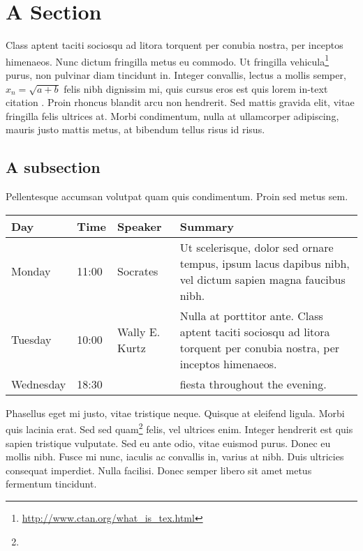 \documentclass[12pt,a4paper]{article}
\begin{document}
\newpage
\section{A Section}
\label{sec:1}

Class aptent taciti sociosqu ad litora torquent per conubia nostra,
per inceptos himenaeos. Nunc dictum fringilla metus eu commodo.  Ut
fringilla
vehicula\footnote{\url{http://www.ctan.org/what_is_tex.html}} purus,
non pulvinar diam tincidunt in. Integer convallis, lectus a mollis
semper, $x_n = \sqrt{a + b}$ felis nibh dignissim mi, quis cursus eros
est quis lorem in-text citation \cite[p.\ 19]{Abook2011}.  Proin
rhoncus blandit arcu non hendrerit. Sed mattis gravida elit, vitae
fringilla felis ultrices at. Morbi condimentum, nulla at ullamcorper
adipiscing, mauris justo mattis metus, at bibendum tellus risus id
risus.

\subsection{A subsection}
\label{sec:1-1}

Pellentesque accumsan volutpat quam quis condimentum. Proin sed metus
sem.

\begin{center}
  \begin{tabular}{ | l | l | l | p{5cm} |}
    \hline
    Day & Time & Speaker & Summary \\ \hline
    Monday & 11:00 & Socrates &  Ut scelerisque, dolor sed
    ornare tempus, ipsum lacus dapibus nibh, vel dictum sapien magna
    faucibus nibh. \\ \hline
    Tuesday & 10:00 & Wally E. Kurtz & Nulla at porttitor ante. Class aptent taciti sociosqu ad litora torquent per conubia nostra, per inceptos himenaeos. \\ \hline
    Wednesday & 18:30 & &  fiesta throughout the evening. \\
    \hline
    \end{tabular}
\end{center}

Phasellus eget mi justo, vitae tristique neque. Quisque at eleifend
ligula. Morbi quis lacinia erat. Sed sed
quam\footnote{} felis, vel ultrices
enim. Integer hendrerit est quis sapien tristique vulputate. Sed eu
ante odio, vitae euismod purus. Donec eu mollis nibh. Fusce mi nunc,
iaculis ac convallis in, varius at nibh. Duis ultricies consequat
imperdiet. Nulla facilisi. Donec semper libero sit amet metus
fermentum tincidunt.
\end{document}
